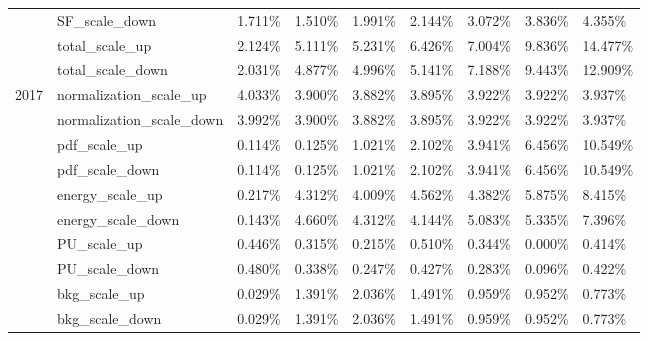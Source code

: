 \begin{table}[htp]
\begin{center}
{\begin{tabular}{|l|l|l|l|l|l|l|l|l|}
&SF\_scale\_down             & 1.711\%        & 1.510\%        & 1.991\%        &2.144\%        & 3.072\%        & 3.836\%        & 4.355\%    \\\cline{2-9}
&total\_scale\_up            & 2.124\%        & 5.111\%        & 5.231\%        &6.426\%        & 7.004\%        & 9.836\%        & 14.477\%   \\\cline{2-9}
&total\_scale\_down          & 2.031\%        & 4.877\%        & 4.996\%        &5.141\%        & 7.188\%        & 9.443\%        & 12.909\%   \\\hline \hline
\multirow{14}{*}{2017}&normalization\_scale\_up    & 4.033\%        & 3.900\%        & 3.882\%        & 3.895\%        & 3.922\%        & 3.922\%        & 3.937\%        \\\cline{2-9}
&normalization\_scale\_down  & 3.992\%        & 3.900\%        & 3.882\%        & 3.895\%        & 3.922\%        & 3.922\%        & 3.937\%        \\\cline{2-9}
&pdf\_scale\_up              & 0.114\%        & 0.125\%        & 1.021\%        & 2.102\%        & 3.941\%        & 6.456\%        & 10.549\%       \\\cline{2-9}
&pdf\_scale\_down            & 0.114\%        & 0.125\%        & 1.021\%        & 2.102\%        & 3.941\%        & 6.456\%        & 10.549\%       \\\cline{2-9}
&energy\_scale\_up           & 0.217\%        & 4.312\%        & 4.009\%        & 4.562\%        & 4.382\%        & 5.875\%        & 8.415\%        \\\cline{2-9}
&energy\_scale\_down         & 0.143\%        & 4.660\%        & 4.312\%        & 4.144\%        & 5.083\%        & 5.335\%        & 7.396\%        \\\cline{2-9}
&PU\_scale\_up               & 0.446\%        & 0.315\%        & 0.215\%        & 0.510\%        & 0.344\%        & 0.000\%        & 0.414\%        \\\cline{2-9}
&PU\_scale\_down             & 0.480\%        & 0.338\%        & 0.247\%        & 0.427\%        & 0.283\%        & 0.096\%        & 0.422\%        \\\cline{2-9}
&bkg\_scale\_up              & 0.029\%        & 1.391\%        & 2.036\%        & 1.491\%        & 0.959\%        & 0.952\%        & 0.773\%        \\\cline{2-9}
&bkg\_scale\_down            & 0.029\%        & 1.391\%        & 2.036\%        & 1.491\%        & 0.959\%        & 0.952\%        & 0.773\%        \\\cline{2-9}

\end{tabular}}
\end{center}
\end{table}
